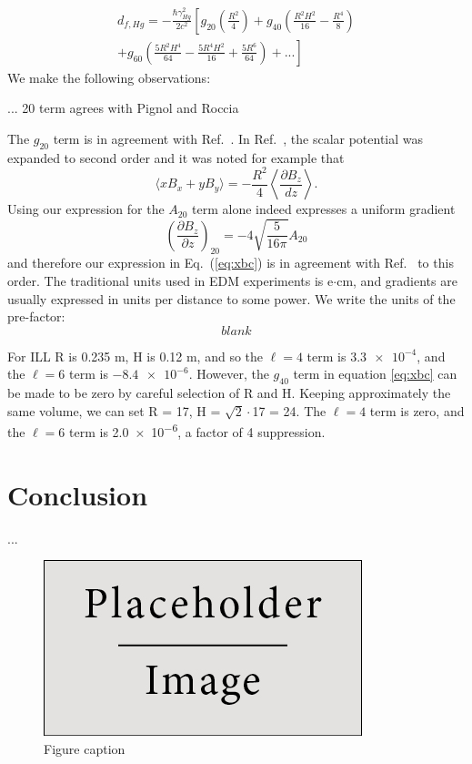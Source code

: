 \documentclass[preprint,12pt]{elsarticle}
\begin{document}
\begin{multline}
    d_{f,Hg} = -\frac{\hbar\gamma_{Hg}^{2}}{2c^{2}}\left[g_{20}\left(\frac{R^{2}}{4}\right)+g_{40}\left(\frac{R^{2}H^{2}}{16}-\frac{R^{4}}{8}\right)\right.\\
    +\left.g_{60}\left(\frac{5R^{2}H^{4}}{64}-\frac{5R^{4}H^{2}}{16}+\frac{5R^{6}}{64}\right)+...\right]
\end{multline}
We make the following observations:

... 20 term agrees with Pignol and Roccia

The $g_{20}$ term is in agreement with Ref.~\cite{bib:pignol}.  In
Ref.~\cite{bib:pignol}, the scalar potential was expanded to second
order and it was noted for example that
\begin{equation}
  \langle xB_x+yB_y\rangle=-\frac{R^2}{4}\left\langle\frac{\partial B_z}{dz}\right\rangle.
\end{equation}
Using our expression for the $A_{20}$ term alone indeed expresses a
uniform gradient
\begin{equation}
  \left(\frac{\partial B_z}{\partial
    z}\right)_{20}=-4\sqrt{\frac{5}{16\pi}}A_{20}
\end{equation}
and therefore our expression in Eq.~(\ref{eq:xbc}) is in agreement with
Ref.~\cite{bib:pignol} to this order.  The traditional units used in EDM experiments is e$\cdot$cm, and gradients are usually expressed in units per distance to some power.  We write the units of the pre-factor:
\begin{equation}
   blank
\end{equation}

For ILL R is 0.235 m, H is 0.12 m, and so the $\ell=4$ term is $\num{3.3e-4}$, and the $\ell=6$ term is $\num{-8.4e-6}$.  However, the $g_{40}$ term in equation \ref{eq:xbc} can be made to be zero by careful selection of R and H.  Keeping approximately the same volume, we can set R = 17, H = $\sqrt{2}\cdot$17 = 24.  The $\ell=4$ term is zero, and the $\ell=6$ term is \num{2.0e-6}, a factor of 4 suppression.


\section{Conclusion}

...


\begin{figure}[h]
\centering\includegraphics[width=0.4\linewidth]{placeholder}
\caption{Figure caption}
\end{figure}
\end{document}
